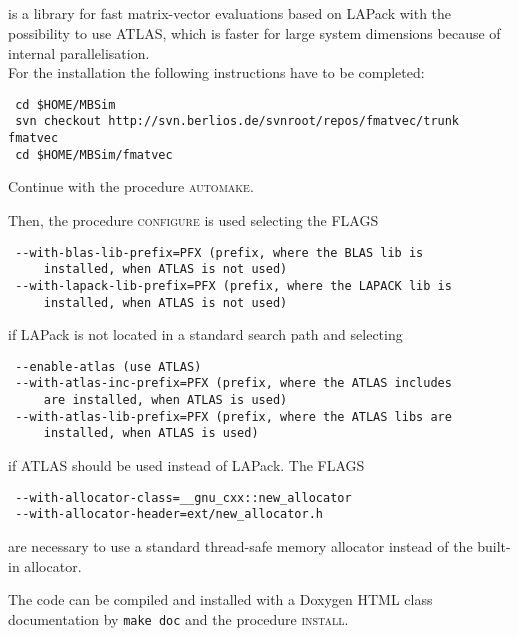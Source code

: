 \subsection{\FMatVec{}}
\FMatVec{} is a library for fast matrix-vector evaluations based on LAPack with the possibility to use ATLAS, which is faster for large system dimensions because of internal parallelisation.\\
For the installation the following instructions have to be completed:
\begin{verbatim}
 cd $HOME/MBSim
 svn checkout http://svn.berlios.de/svnroot/repos/fmatvec/trunk fmatvec
 cd $HOME/MBSim/fmatvec
\end{verbatim}
Continue with the procedure \textsc{automake}.\par
Then, the procedure \textsc{configure} is used selecting the FLAGS
\begin{verbatim}
 --with-blas-lib-prefix=PFX (prefix, where the BLAS lib is
     installed, when ATLAS is not used)
 --with-lapack-lib-prefix=PFX (prefix, where the LAPACK lib is
     installed, when ATLAS is not used)
\end{verbatim}
if LAPack is not located in a standard search path and selecting
\begin{verbatim}
 --enable-atlas (use ATLAS)
 --with-atlas-inc-prefix=PFX (prefix, where the ATLAS includes 
     are installed, when ATLAS is used)
 --with-atlas-lib-prefix=PFX (prefix, where the ATLAS libs are
     installed, when ATLAS is used)
\end{verbatim}
if ATLAS should be used instead of LAPack. The FLAGS
\begin{verbatim}
 --with-allocator-class=__gnu_cxx::new_allocator
 --with-allocator-header=ext/new_allocator.h
\end{verbatim}
are necessary to use a standard thread-safe memory allocator instead of the \FMatVec{} built-in allocator.\par
The code can be compiled and installed with a Doxygen HTML class documentation by \texttt{make doc} and the procedure \textsc{install}.

